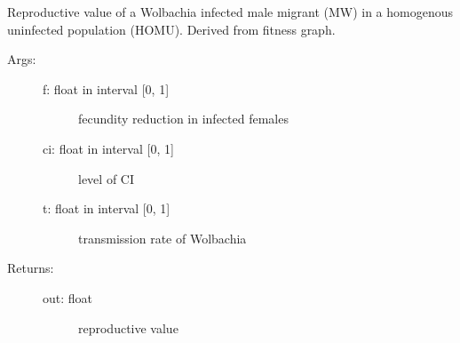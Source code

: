 \documentclass[letterpaper,10pt,english]{sphinxmanual}
\begin{document}
\begin{fulllineitems}
\label{index:wspec.analytical.reproval_MWHOMU}
Reproductive value of a Wolbachia infected male migrant (MW) 
in a homogenous uninfected population (HOMU). Derived from fitness 
graph.
\begin{description}
\item[{Args:}] \leavevmode\begin{description}
\item[{f: float in interval {[}0, 1{]}}] \leavevmode
fecundity reduction in infected females

\item[{ci: float in interval {[}0, 1{]}}] \leavevmode
level of CI

\item[{t: float in interval {[}0, 1{]}}] \leavevmode
transmission rate of Wolbachia

\end{description}

\item[{Returns:}] \leavevmode\begin{description}
\item[{out: float}] \leavevmode
reproductive value

\end{description}

\end{description}

\end{fulllineitems}

\end{document}
